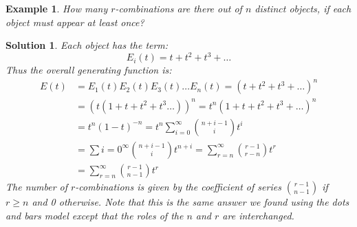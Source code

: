 \documentclass[12pt, letterpaper, onecolumn, conference, final]{IEEEtran}
\theoremstyle{definition}
\theoremstyle{plain}
\newtheorem{example}{Example}[section]
\newtheorem{solution}{Solution}[section]
\begin{document}
\begin{example}
How many $r$-combinations are there out of $n$ distinct objects, if each object must appear at least once?
\end{example}
\begin{solution}
Each object has the term:
\begin{equation*}
E_i(t) = t + t^2 + t^3 + \dots
\end{equation*}
Thus the overall generating function is:
\begin{equation*}
\begin{split}
E(t) &= E_1(t)E_2(t)E_3(t)\dots E_n(t) = (t + t^2 + t^3 + \dots)^n \\
&= (t(1 + t + t^2 + t^3 \dots))^n = t^n (1 + t + t^2 + t^3 + \dots)^n \\
&= t^n (1-t)^{-n} = t^n \sum_{i=0}^\infty {n+i-1 \choose i} t^i \\
&= \sum{i=0}^\infty {n+i-1 \choose i} t^{n+i} = \sum_{r=n}^\infty {r-1 \choose r-n} t^r \\
&= \sum_{r=n}^\infty {r-1 \choose n-1} t^r
\end{split}
\end{equation*}
The number of $r$-combinations is given by the coefficient of series ${r-1 \choose n-1}$ if $r \geq n$ and 0 otherwise. Note that this is the same answer we found using the dots and bars model except that the roles of the $n$ and $r$ are interchanged. 
\end{solution}
\end{document}
